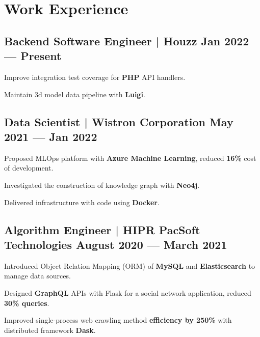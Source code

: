 \section{Work Experience}

\subsection*{Backend Software Engineer | Houzz  \hfill Jan 2022 --- Present} 
\begin{zitemize}
    \item Improve integration test coverage for \textbf{PHP} API handlers.
    \item Maintain 3d model data pipeline with \textbf{Luigi}.
\end{zitemize}

\subsection*{Data Scientist | Wistron Corporation  \hfill May 2021 --- Jan 2022} 
    \begin{zitemize}
        \item Proposed MLOps platform with \textbf{Azure Machine Learning}, reduced \textbf{16\%} cost of development.
        \item Investigated the construction of knowledge graph with \textbf{Neo4j}.
        \item Delivered infrastructure with code using \textbf{Docker}.
    \end{zitemize}


\subsection*{Algorithm Engineer | HIPR PacSoft Technologies \hfill August 2020 --- March 2021} 
    \begin{zitemize}
        \item Introduced Object Relation Mapping (ORM) of \textbf{MySQL} and \textbf{Elasticsearch} to manage data sources.
        \item Designed \textbf{GraphQL} APIs with Flask for a social network application, reduced \textbf{30\% queries}.
        \item Improved single-process web crawling method \textbf{efficiency by 250\%} with distributed framework \textbf{Dask}.
    \end{zitemize}



